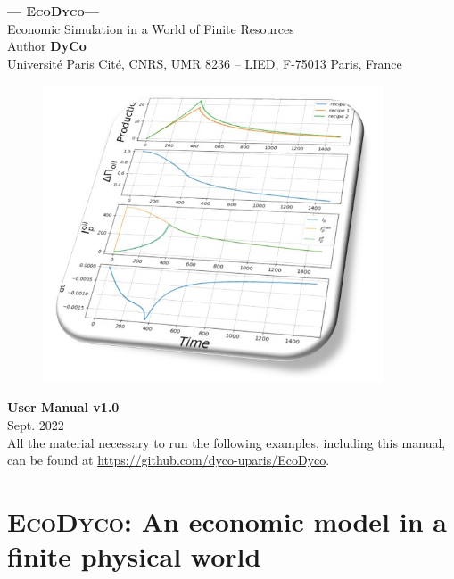 \documentclass[12pt,a4paper]{article}%
\date{}
\newcommand{\ed}{\textsc{EcoDyco}}
\begin{document}
\begin{titlepage}

	\centering
		{\Huge \textbf{--- \ed ---} \\[0pt]}
		{\Large Economic Simulation in a World of Finite Resources \\[1cm]}
		\Large Author \textbf{DyCo} \\ 
		Universit\'e Paris Cit\'e, CNRS, UMR 8236 – LIED, F-75013 Paris, France
		\vspace{1cm}

		\begin{figure}[h]
			\centering \includegraphics[width=0.9\textwidth]{figures/couverture.jpg}
		\end{figure}
	
		\vspace{1cm}
		{\Huge \textbf{User Manual v1.0} \\[0.5cm]}
		{\Large Sept. 2022 \\[0.5cm]}
		{All the material necessary to run the following examples, including this manual, can be found at \url{https://github.com/dyco-uparis/EcoDyco}. 
		}

\end{titlepage}
\restoregeometry

\tableofcontents
\setcounter{page}{1}

\newpage

\section{\ed: An economic model in a finite physical world}
\end{document}
